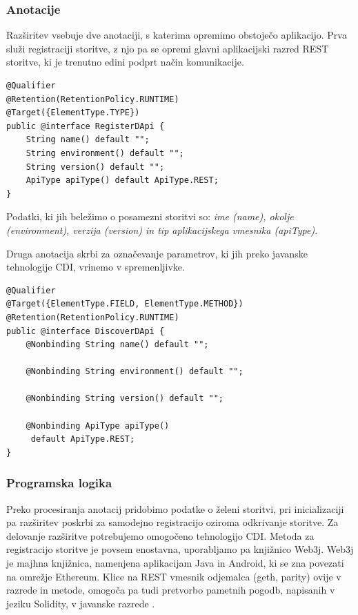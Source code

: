 \documentclass[a4paper, 12pt]{book}
\begin{document}
\subsubsection{Anotacije}
Razširitev vsebuje dve anotaciji, s katerima opremimo obstoječo aplikacijo.
Prva služi registraciji storitve, z njo pa se opremi glavni aplikacijski razred REST storitve, ki je trenutno edini podprt način komunikacije.

\begin{lstlisting}
@Qualifier
@Retention(RetentionPolicy.RUNTIME)
@Target({ElementType.TYPE})
public @interface RegisterDApi {
	String name() default "";
	String environment() default "";
	String version() default "";
	ApiType apiType() default ApiType.REST;
}
\end{lstlisting}

Podatki, ki jih beležimo o posamezni storitvi so: \textit{ime (name), okolje (environment), verzija (version) in tip aplikacijskega vmesnika (apiType)}.


Druga anotacija skrbi za označevanje parametrov, ki jih preko javanske tehnologije CDI, vrinemo v spremenljivke.

\begin{lstlisting}
@Qualifier
@Target({ElementType.FIELD, ElementType.METHOD})
@Retention(RetentionPolicy.RUNTIME)
public @interface DiscoverDApi {
	@Nonbinding String name() default "";
	
	@Nonbinding String environment() default "";
	
	@Nonbinding String version() default "";
	
	@Nonbinding ApiType apiType()
	 default ApiType.REST;
}
\end{lstlisting}

\subsubsection{Programska logika}
Preko procesiranja anotacij pridobimo podatke o želeni storitvi, pri inicializaciji pa razširitev poskrbi za samodejno registracijo oziroma odkrivanje storitve.
Za delovanje razširitve potrebujemo omogočeno tehnologijo CDI.
Metoda za registracijo storitve je povsem enostavna, uporabljamo pa knjižnico Web3j.
Web3j je majhna knjižnica, namenjena aplikacijam Java in Android, ki se zna povezati na omrežje Ethereum.
Klice na REST vmesnik odjemalca (geth, parity) ovije v razrede in metode, omogoča pa tudi pretvorbo pametnih pogodb, napisanih v jeziku Solidity, v javanske razrede \cite{web3j}.
\end{document}
